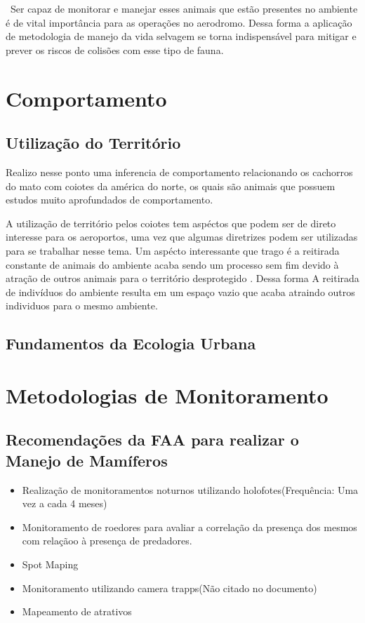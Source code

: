 \documentclass[a4paper,16,onecolumn]{article}
\begin{document}
\begin{itemize}
\ Ser capaz de monitorar e manejar esses animais que estão presentes no ambiente é de vital importância para as operações no aerodromo. Dessa forma a aplicação de metodologia de manejo da vida selvagem se torna indispensável para mitigar e prever os riscos de colisões com esse tipo de fauna.

\section{Comportamento}
\subsection{Utilização do Território}

Realizo nesse ponto uma inferencia de comportamento relacionando os cachorros do mato com coiotes da américa do norte, os quais são animais que possuem estudos muito aprofundados de comportamento. 

A utilização de território pelos coiotes tem aspéctos que podem ser de direto interesse para os aeroportos, uma vez que algumas diretrizes podem ser utilizadas para se trabalhar nesse tema. Um aspécto interessante que trago é a reitirada constante de animais do ambiente acaba sendo um processo sem fim devido à atração de outros animais para o território desprotegido \cite{Lehner1976} . Dessa forma A reitirada de indivíduos do ambiente resulta em um espaço vazio que acaba atraindo outros individuos para o mesmo ambiente.
\subsection{Fundamentos da Ecologia Urbana}


\section{Metodologias de Monitoramento}
\subsection{Recomendações da FAA para realizar o Manejo de Mamíferos \cite{FAA2018}}
\begin{itemize}
\item Realização de monitoramentos noturnos utilizando holofotes(Frequência: Uma vez a cada 4 meses)
\item Monitoramento de roedores para avaliar a correlação da presença dos mesmos com relaçãoo à presença de predadores.
\item Spot Maping
\item Monitoramento utilizando camera trapps(Não citado no documento)
\item Mapeamento de atrativos


\end{itemize}
\end{itemize}
\end{document}
